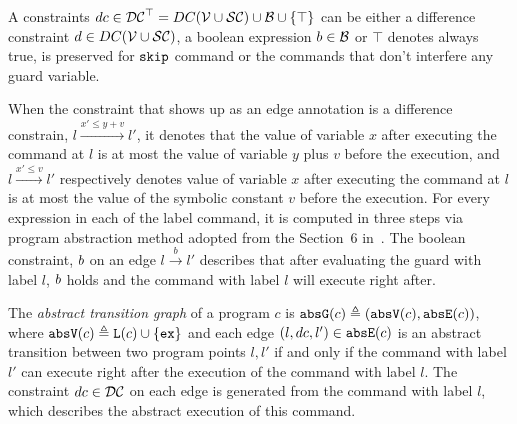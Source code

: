 \begin{defn}[Constraints]
A constraints $dc \in \mathcal{DC}^{\top} = DC(\mathcal{V}  \cup \mathcal{SC}) \cup \mathcal{B}\cup \{\top\}$  can be either a
difference constraint $d \in DC(\mathcal{V}  \cup \mathcal{SC})$, a boolean expression $b \in \mathcal{B}$
or $\top$ denotes always true, is preserved for $\mathtt{skip}$ command or the commands that don't interfere any guard variable.
\end{defn}

When the constraint that shows up as an edge annotation is a difference constrain, $l \xrightarrow{x' \leq y + v} l'$,
it denotes that
the value of variable $x$
after executing the command at $l$ is at most
the value of variable $y$ plus $v$ before the execution,
and $l \xrightarrow{x' \leq v} l'$ respectively denotes value of variable $x$
after executing the command at $l$ is at most
the value of the symbolic constant $v$ before the execution.
For every expression in each of the label command, it is computed in three steps via program abstraction method adopted from the Section~6 in~\cite{SinnZV17}. 
The boolean constraint, $b$ on an edge $l \xrightarrow{b} l'$ describes
that after evaluating the guard with label $l$,
$b$ holds and the command with label $l$ will execute right after.

\begin{defn}
  \label{def:abs_cfg}
  The \emph{abstract transition graph} of a program $c$ is $\mathtt{abs}{\mathtt{G}}(c) \triangleq (\mathtt{abs}{\mathtt{V}}(c), \mathtt{abs}{\mathtt{E}}(c))$, where
  $\mathtt{abs}{\mathtt{V}}(c) \triangleq \mathtt{L}(c)\cup\{\mathtt{ex}\}$
  and 
  each edge $(l, dc, l') \in \mathtt{abs}{\mathtt{E}}(c)$ is an abstract transition
between two program points $l, l'$ if and only if
the command with label $l'$ can execute right after the execution of the command with label $l$.
The constraint $dc \in \mathcal{DC}$ on each edge is generated from the command with label $l$, which describes the abstract execution of this command.
\end{defn}

